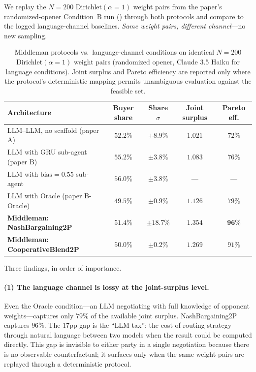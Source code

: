 \documentclass[11pt,a4paper]{article}
\begin{document}
We replay the $N = 200$ Dirichlet$(\alpha\!=\!1)$ weight pairs from the paper's randomized-opener Condition~B run () through both protocols and compare to the logged language-channel baselines. \emph{Same weight pairs, different channel}---no new sampling.

\begin{table}[h]
\centering
\caption{Middleman protocols vs.\ language-channel conditions on identical $N = 200$ Dirichlet$(\alpha\!=\!1)$ weight pairs (randomized opener, Claude 3.5 Haiku for language conditions). Joint surplus and Pareto efficiency are reported only where the protocol's deterministic mapping permits unambiguous evaluation against the feasible set.}
\label{tab:middleman_offline}
\small
\begin{tabular}{lcccc}
\toprule
Architecture & Buyer share & Share $\sigma$ & Joint surplus & Pareto eff. \\
\midrule
LLM--LLM, no scaffold (paper A)        & $52.2\%$ & $\pm 8.9\%$ & $1.021$ & $72\%$ \\
LLM with GRU sub-agent (paper B)       & $55.2\%$ & $\pm 3.8\%$ & $1.083$ & $76\%$ \\
LLM with $\text{bias}\!=\!0.55$ sub-agent & $56.0\%$ & $\pm 3.8\%$ & --- & --- \\
LLM with Oracle (paper B-Oracle)       & $49.5\%$ & $\pm 0.9\%$ & $1.126$ & $79\%$ \\
\midrule
\textbf{Middleman: NashBargaining2P}   & $51.4\%$ & $\pm 18.7\%$ & $\mathbf{1.354}$ & $\mathbf{96\%}$ \\
\textbf{Middleman: CooperativeBlend2P} & $50.0\%$ & $\mathbf{\pm 0.2\%}$ & $1.269$ & $91\%$ \\
\bottomrule
\end{tabular}
\end{table}

Three findings, in order of importance.

\paragraph{(1) The language channel is lossy at the joint-surplus level.} Even the Oracle condition---an LLM negotiating with full knowledge of opponent weights---captures only $79\%$ of the available joint surplus. NashBargaining2P captures $96\%$. The $17$pp gap is the ``LLM tax'': the cost of routing strategy through natural language between two models when the result could be computed directly. This gap is invisible to either party in a single negotiation because there is no observable counterfactual; it surfaces only when the same weight pairs are replayed through a deterministic protocol.
\end{document}
